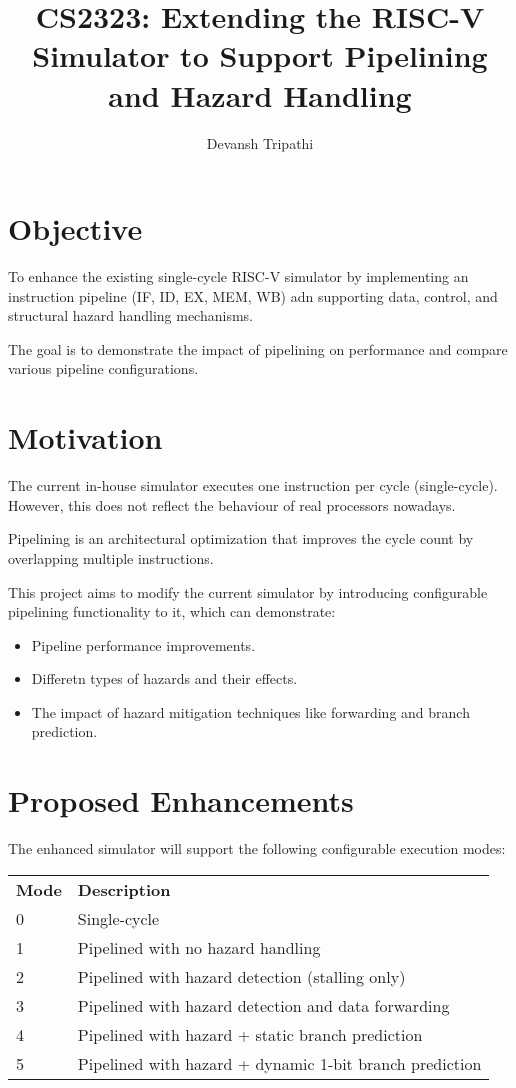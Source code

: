 \documentclass{article}
\author{Devansh Tripathi}
\title{CS2323: Extending the RISC-V Simulator to Support Pipelining and Hazard Handling}
\date{}
\begin{document}
\maketitle
\newpage
\tableofcontents
\newpage
\section{Objective}
To enhance the existing single-cycle RISC-V simulator by implementing an instruction pipeline (IF, ID, EX, MEM, WB) adn supporting data, control, and structural hazard handling mechanisms.

The goal is to demonstrate the impact of pipelining on performance and compare various pipeline configurations.

\section{Motivation}
The current in-house simulator executes one instruction per cycle (single-cycle). However, this does not reflect the behaviour of real processors nowadays.

Pipelining is an architectural optimization that improves the cycle count by overlapping multiple instructions.

This project aims to modify the current simulator by introducing configurable pipelining functionality to it, which can demonstrate:
\begin{itemize}
    \item Pipeline performance improvements.
    \item Differetn types of hazards and their effects.
    \item The impact of hazard mitigation techniques like forwarding and branch prediction.
\end{itemize}

\section{Proposed Enhancements}
The enhanced simulator will support the following configurable execution modes:
\begin{table}[H]
\begin{tabular}{ll}
\textbf{Mode} & \textbf{Description}                                    \\
0             & Single-cycle                                            \\
1             & Pipelined with no hazard handling                       \\
2             & Pipelined with hazard detection (stalling only)         \\
3             & Pipelined with hazard detection and data forwarding     \\
4             & Pipelined with hazard + static branch prediction        \\
5             & Pipelined with hazard + dynamic 1-bit branch prediction
\end{tabular}
\end{table}
\end{document}
